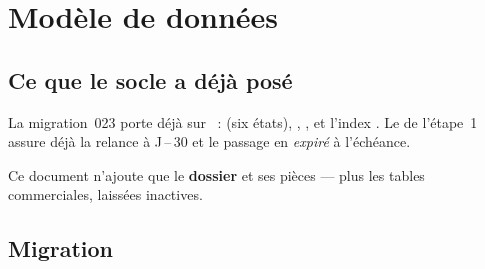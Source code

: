 
\chapter{Modèle de données}

\section{Ce que le socle a déjà posé}

\begin{constat}
La migration~023 porte déjà sur ~:  (six états),
, , et l'index
. Le  de l'étape~1 assure déjà
la relance à J\,--\,30 et le passage en \emph{expiré} à l'échéance.
\end{constat}

Ce document n'ajoute que le \textbf{dossier} et ses pièces --- plus les tables commerciales,
laissées inactives.

\section{Migration }

